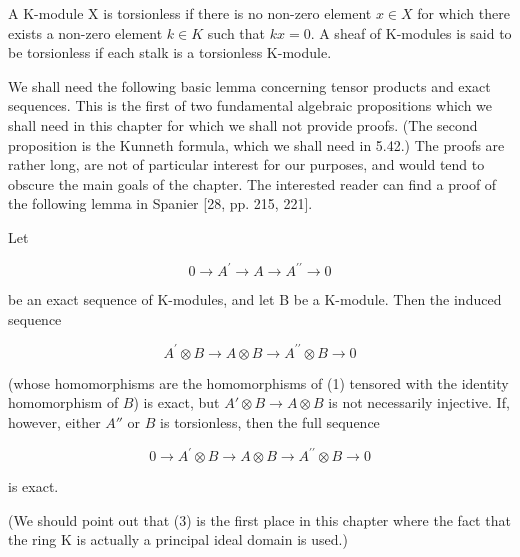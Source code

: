 \begin{definition}\label{thm:5.13}
A K-module X is torsionless if there is no non-zero element  $ x \in X $ for which there exists a non-zero element  $ k \in K $ such that  $ kx = 0 $. A sheaf of K-modules is said to be torsionless if each stalk is a torsionless K-module.

\end{definition}

We shall need the following basic lemma concerning tensor products and exact sequences. This is the first of two fundamental algebraic propositions which we shall need in this chapter for which we shall not provide proofs. (The second proposition is the Kunneth formula, which we shall need in 5.42.) The proofs are rather long, are not of particular interest for our purposes, and would tend to obscure the main goals of the chapter. The interested reader can find a proof of the following lemma in Spanier [28, pp. 215, 221].

\begin{lemma}\label{thm:5.14}
Let

\begin{equation}
\tag{1}\label{eq:5.14:1}
0\to A^{\prime}\to A\to A^{\prime \prime}\to0
\end{equation}

be an exact sequence of K-modules, and let B be a K-module. Then the induced sequence

\begin{equation}
\tag{2}\label{eq:5.14:2}
A^{\prime}\otimes B\to A\otimes B\to A^{\prime \prime}\otimes B\to0
\end{equation}

(whose homomorphisms are the homomorphisms of (1) tensored with the identity homomorphism of $B$) is exact, but $A'\otimes B\to A\otimes B$ is not necessarily injective. If, however, either $A''$ or $B$ is torsionless, then the full sequence

\begin{equation}
\tag{3}\label{eq:5.14:3}
0\to A^{\prime}\otimes B\to A\otimes B\to A^{\prime \prime}\otimes B\to0
\end{equation}

is exact.

(We should point out that (3) is the first place in this chapter where the fact that the ring K is actually a principal ideal domain is used.)

\end{lemma}

